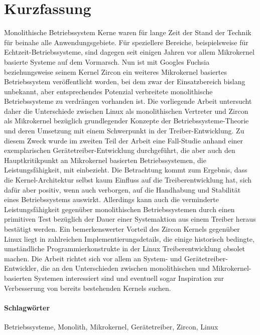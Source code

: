 
\section*{Kurzfassung}
Monolithische Betriebssystem Kerne waren für lange Zeit der Stand der Technik für beinahe alle Anwendungsgebiete.
Für speziellere Bereiche, beispielsweise für Echtzeit-Betriebssysteme, sind dagegen seit einigen Jahren vor allem Mikrokernel basierte Systeme auf dem Vormarsch.
Nun ist mit Googles Fuchsia beziehungsweise seinem Kernel Zircon ein weiteres Mikrokernel basiertes Betriebssystem veröffentlicht worden, bei dem zwar der Einsatzbereich bislang unbekannt, aber entsprechendes Potenzial verbreitete monolithische Betriebssysteme zu verdrängen vorhanden ist.
Die vorliegende Arbeit untersucht daher die Unterschiede zwischen Linux als monolithischen Vertreter und Zircon als Mikrokernel bezüglich grundlegender Konzepte der Betriebssysteme-Theorie und deren Umsetzung mit einem Schwerpunkt in der Treiber-Entwicklung.
Zu diesem Zweck wurde im zweiten Teil der Arbeit eine Fall-Studie anhand einer exemplarischen Gerätetreiber-Entwicklung durchgeführt, die aber auch den Hauptkritikpunkt an Mikrokernel basierten Betriebssystemen, die Leistungsfähigkeit, mit einbezieht.
Die Betrachtung kommt zum Ergebnis, dass die Kernel-Architektur selbst kaum Einfluss auf die Treiberentwicklung hat, sich dafür aber positiv, wenn auch verborgen, auf die Handhabung und Stabilität eines Betriebssystems auswirkt.
Allerdings kann auch die verminderte Leistungsfähigkeit gegenüber monolithischen Betriebssystemen durch einen primitiven Test bezüglich der Dauer einer Systemaktion aus einem Treiber heraus bestätigt werden.
Ein bemerkenswerter Vorteil des Zircon Kernels gegenüber Linux liegt in zahlreichen Implementierungsdetails, die einige historisch bedingte, umständliche Programmierkonstrukte in der Linux Treiberentwicklung obsolet machen.
Die Arbeit richtet sich vor allem an System- und Gerätetreiber-Entwickler, die an den Unterschieden zwischen monolithischen und Mikrokernel-basierten Systemen interessiert sind und eventuell sogar Inspiration zur Verbesserung von bereits bestehenden Kernels suchen.

\paragraph{Schlagwörter} Betriebssysteme, Monolith, Mikrokernel, Gerätetreiber, Zircon, Linux 

\newpage
